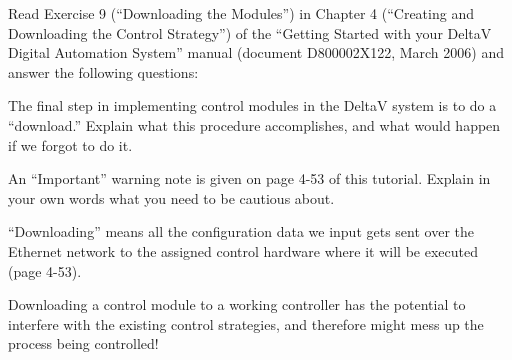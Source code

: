 

Read Exercise 9 (``Downloading the Modules'') in Chapter 4 (``Creating and Downloading the Control Strategy'') of the ``Getting Started with your DeltaV Digital Automation System'' manual (document D800002X122, March 2006) and answer the following questions:

\vskip 10pt

The final step in implementing control modules in the DeltaV system is to do a ``download.''  Explain what this procedure accomplishes, and what would happen if we forgot to do it.

\vskip 10pt

An ``Important'' warning note is given on page 4-53 of this tutorial.  Explain in your own words what you need to be cautious about.














``Downloading'' means all the configuration data we input gets sent over the Ethernet network to the assigned control hardware where it will be executed (page 4-53).

\vskip 10pt

Downloading a control module to a working controller has the potential to interfere with the existing control strategies, and therefore might mess up the process being controlled!




